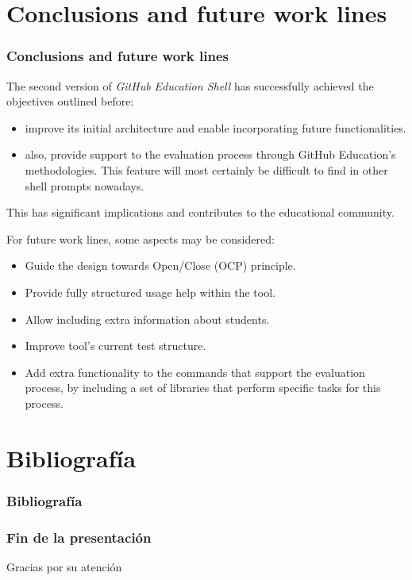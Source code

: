 \documentclass{beamer}
\begin{document}
\section{Conclusions and future work lines}
\begin{frame}[allowframebreaks]
  \frametitle{Conclusions and future work lines}
  The second version of {\it GitHub Education Shell} has successfully achieved the objectives outlined before:
  \begin{itemize}
    \item  improve its initial architecture and enable incorporating future functionalities.
    \item  also, provide support to the evaluation process through GitHub Education’s methodologies. This feature will most certainly be difficult to find in other shell prompts nowadays.
  \end{itemize}
  This has significant implications and contributes to the educational community.

  \framebreak

  For future work lines, some aspects may be considered:
  \begin{itemize}
    \item Guide the design towards Open/Close (OCP) principle.
    \item Provide fully structured usage help within the tool.
    \item Allow including extra information about students.
    \item Improve tool's current test structure.
    \item Add extra functionality to the commands that support the evaluation process, by including a set of libraries
    that perform specific tasks for this process.
  \end{itemize}
\end{frame}


\section{Bibliografía}
\begin{frame}[allowframebreaks]
  \frametitle{Bibliografía}
  
  
  \nocite{*}
\end{frame}

\begin{frame}
  \frametitle{Fin de la presentación}
  \begin{center}
    \Huge{Gracias por su atención}
  \end{center}
\end{frame}
\end{document}
